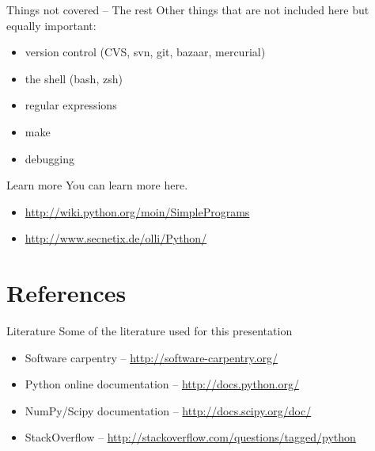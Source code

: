 \documentclass[xetex,10pt]{beamer}
\def\spacer{\vspace*{1em}}
\begin{document}
\begin{frame}[fragile]{Things not covered -- The rest}
	Other things that are not included here but equally important:
	\vspace*{1em}
	\begin{itemize}
		\item version control (CVS, svn, git, bazaar, mercurial)
		\item the shell (bash, zsh)
		\item regular expressions
		\item make
		\item debugging
	\end{itemize}
\end{frame}

\begin{frame}[fragile]{Learn more}
	You can learn more here.
	\vspace*{1em}
	\begin{itemize}
		\item \url{http://wiki.python.org/moin/SimplePrograms}
		\item \url{http://www.secnetix.de/olli/Python/}
	\end{itemize}
\end{frame}

\section*{References}

\begin{frame}{Literature}
	Some of the literature used for this presentation
	\spacer
	\begin{itemize}
		\item Software carpentry -- \url{http://software-carpentry.org/}
		\item Python online documentation -- \url{http://docs.python.org/}
		\item NumPy/Scipy documentation -- \url{http://docs.scipy.org/doc/}
		\item StackOverflow -- \url{http://stackoverflow.com/questions/tagged/python}
	\end{itemize}
	
\end{frame}
\end{document}

